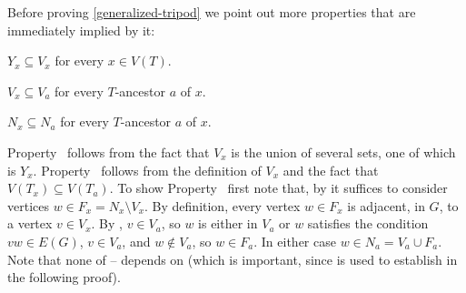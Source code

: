  Before proving \cref{generalized-tripod} we point out more properties that are immediately implied by it:

 \begin{compactenum}[(Y1)]\setcounter{enumi}{2}
   \item{} $Y_x\subseteq V_x$ for every $x\in V(T)$. 
   \item{} $V_x\subseteq V_a$ for every $T$-ancestor $a$ of $x$.
   \item{}$N_x\subseteq N_a$ for every $T$-ancestor $a$ of $x$.
 \end{compactenum}

 Property~ follows from the fact that $V_x$ is the union of several sets, one of which is $Y_x$.  Property~ follows from the definition of $V_x$ and the fact that $V(T_x)\subseteq V(T_a)$. To show Property~ first note that, by  it suffices to consider vertices $w\in F_x=N_x\setminus V_x$. By definition, every vertex $w\in F_x$ is adjacent, in $G$, to a vertex $v\in V_x$.  By , $v\in V_a$, so $w$ is either in $V_a$ or $w$ satisfies the condition $vw\in E(G)$, $v\in V_a$, and $w\not\in V_a$, so $w\in F_a$.  In either case $w\in N_a=V_a\cup F_a$.  Note that none of -- depends on  (which is important, since  is used to establish  in the following proof).


